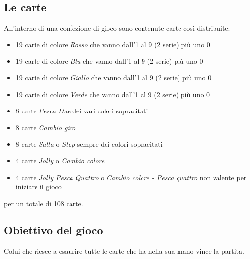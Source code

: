 		\subsection{Le carte}
			All'interno di una confezione di gioco sono contenute carte così distribuite:
			\begin{itemize}
			\item 19 carte di colore \textit{Rosso} che vanno dall'1 al 9 (2 serie) più uno 0
			\item 19 carte di colore \textit{Blu} che vanno dall'1 al 9 (2 serie) più uno 0
			\item 19 carte di colore \textit{Giallo}  che vanno dall'1 al 9 (2 serie) più uno 0
			\item 19 carte di colore \textit{Verde}  che vanno dall'1 al 9 (2 serie) più uno 0
			\item 8 carte \textit{Pesca Due} dei vari colori sopracitati
			\item 8 carte \textit{Cambio giro} 
			\item 8 carte \textit{Salta} o \textit{Stop} sempre dei colori sopracitati
			\item 4 carte \textit{Jolly} o \textit{Cambio colore}
			\item 4 carte \textit{Jolly Pesca Quattro} o \textit{Cambio colore - Pesca quattro} non valente per iniziare il gioco
			\end{itemize}
			per un totale di 108 carte.
			
		\subsection{Obiettivo del gioco}	
			Colui che riesce a esaurire tutte le carte che ha nella sua mano vince la partita.
			
